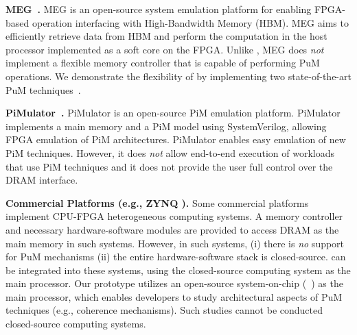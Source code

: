 \textbf{MEG~\cite{zhang2020MEG}.} MEG is an open-source system emulation platform for enabling FPGA-based operation interfacing with High-Bandwidth Memory (HBM). MEG aims to efficiently retrieve data from HBM and perform the computation in the host processor implemented as a soft core on the FPGA. Unlike \X, MEG does \emph{not} implement a flexible memory controller that is capable of performing PuM operations. We demonstrate the flexibility of \X by implementing two state-of-the-art PuM techniques~\cite{seshadri2013rowclone,kim.hpca19}. 

{\textbf{PiMulator~\cite{mosanu2022pimulator}.} PiMulator is an open-source PiM emulation platform. PiMulator implements a main memory and a PiM model using SystemVerilog, allowing FPGA emulation of PiM architectures. PiMulator enables easy emulation of new PiM techniques. However, it does \emph{not} allow end-to-end execution of workloads that use PiM techniques and it does not provide the user  full control over the DRAM interface.}

\textbf{Commercial Platforms (e.g., ZYNQ \cite{zynq}).} Some commercial platforms implement CPU-FPGA heterogeneous computing systems. A memory controller and necessary hardware-software modules are provided to access DRAM as the main memory in such systems. However, in such systems, (i) there is \emph{no} support for PuM mechanisms (ii) the entire hardware-software stack is closed-source. \X can be integrated into these systems, using the closed-source computing system as the main processor. Our prototype utilizes an open-source system-on-chip (~\cite{asanovic2016rocket}) as the main processor, which enables developers to study architectural  aspects of PuM techniques (e.g.,  coherence mechanisms). Such studies cannot be conducted  closed-source computing systems.

